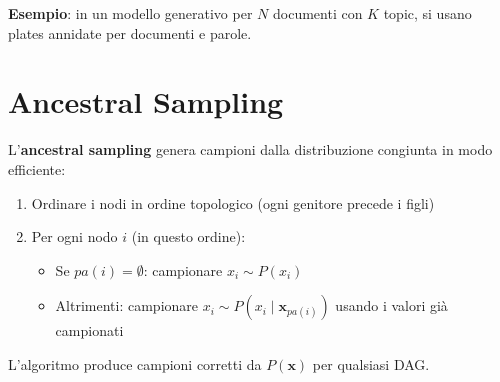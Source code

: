 \textbf{Esempio}: in un modello generativo per $N$ documenti con $K$ topic, si usano plates annidate per documenti e parole.

\section{Ancestral Sampling}

L'\textbf{ancestral sampling} genera campioni dalla distribuzione congiunta in modo efficiente:

\begin{enumerate}
    \item Ordinare i nodi in ordine topologico (ogni genitore precede i figli)
    \item Per ogni nodo $i$ (in questo ordine):
    \begin{itemize}
        \item Se $pa(i) = \emptyset$: campionare $x_i \sim P(x_i)$
        \item Altrimenti: campionare $x_i \sim P(x_i \mid \mathbf{x}_{pa(i)})$ usando i valori già campionati
    \end{itemize}
\end{enumerate}

L'algoritmo produce campioni corretti da $P(\mathbf{x})$ per qualsiasi DAG.

